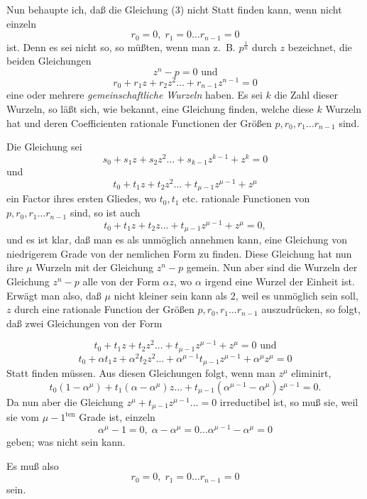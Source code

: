 \documentclass{article}
\begin{document}
Nun behaupte ich, daß die Gleichung (3) nicht Statt finden kann, wenn nicht einzeln
\[ r_0 = 0, \; r_1 = 0 \ldots r_{n-1} = 0 \]
ist. Denn es sei nicht so, so müßten, wenn man z.\ B. $p^{\frac{1}{n}}$ durch $z$ bezeichnet, die beiden Gleichungen
\[ z^{n} - p = 0 \text{ und} \]
\[ r_0 + r_1 z + r_2 z^{2} \ldots + r_{n-1} z^{n-1} = 0 \]
eine oder mehrere \emph{gemeinschaftliche Wurzeln} haben. Es sei $k$ die Zahl dieser Wurzeln, so läßt sich, wie bekannt, eine Gleichung finden, welche diese $k$ Wurzeln hat und deren Coefficienten rationale Functionen der Größen $p, r_0, r_1 \ldots r_{n-1}$ sind.

Die Gleichung sei
\[ s_0 + s_1 z + s_2 z^{2} \ldots + s_{k-1} z^{k-1} + z^{k} = 0 \]
und
\[ t_0 + t_1 z + t_2 z^{2} \ldots + t_{\mu-1} z^{\mu-1} + z^{\mu} \]
ein Factor ihres ersten Gliedes, wo $t_0, t_1$ etc. rationale Functionen von $p, r_0, r_1 \ldots r_{n-1}$ sind, so ist auch
\[ t_0 + t_1 z + t_2 z \ldots + t_{\mu-1} z^{\mu-1} + z^{\mu} = 0, \]
und es ist klar, daß man es als unmöglich annehmen kann, eine Gleichung von niedrigerem Grade von der nemlichen Form zu finden. Diese Gleichung hat nun ihre $\mu$ Wurzeln mit der Gleichung $z^{n} - p$ gemein. Nun aber sind die Wurzeln der Gleichung $z^{n} - p$ alle von der Form $\alpha z$, wo $\alpha$ irgend eine Wurzel der Einheit ist. Erwägt man also, daß $\mu$ nicht kleiner sein kann als 2, weil es unmöglich sein soll, $z$ durch eine rationale Function der Größen $p, r_0, r_1 \ldots r_{n-1}$ auszudrücken, so folgt, daß zwei Gleichungen von der Form

\[ t_0 + t_1 z + t_2 z^{2} \ldots + t_{\mu-1} z^{\mu-1} + z^{\mu} = 0 \text{ und} \]
\[ t_0 + \alpha t_1 z + \alpha^{2} t_2 z^{2} \ldots + \alpha^{\mu-1} t_{\mu-1} z^{\mu-1} + \alpha^{\mu} z^{\mu} = 0 \]
Statt finden müssen. Aus diesen Gleichungen folgt, wenn man $z^{\mu}$ eliminirt,
\[ t_0(1 - \alpha^{\mu}) + t_1(\alpha - \alpha^{\mu})z \ldots + t_{\mu-1}(\alpha^{\mu-1} - \alpha^{\mu})z^{\mu-1} = 0. \]
Da nun aber die Gleichung $z^{\mu} + t_{\mu-1} z^{\mu-1} \ldots = 0$ irreductibel ist, so muß sie, weil sie vom $\mu - 1^{\text{ten}}$ Grade ist, einzeln
\[ \alpha^{\mu} - 1 = 0, \; \alpha - \alpha^{\mu} = 0 \ldots \alpha^{\mu-1} - \alpha^{\mu} = 0 \]
geben; was nicht sein kann.

Es muß also
\[ r_0 = 0, \; r_1 = 0 \ldots r_{n-1} = 0 \]
sein.
\end{document}
